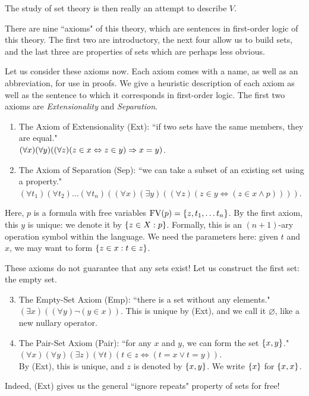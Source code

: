 \documentclass{article}
\begin{document}
The study of set theory is then really an attempt to describe $V$.

There are nine ``axioms" of this theory, which are sentences in first-order logic of this theory. The first two are introductory, the next four allow us to build sets, and the last three are properties of sets which are perhaps less obvious.

Let us consider these axioms now. Each axiom comes with a name, as well as an abbreviation, for use in proofs. We give a heuristic description of each axiom as well as the sentence to which it corresponds in first-order logic. The first two axioms are \textit{Extensionality} and \textit{Separation}.

\begin{enumerate}
    \item The Axiom of Extensionality (Ext): ``if two sets have the same members, they are equal." \\
    $(\forall x)(\forall y)((\forall z)(z \in x \Leftrightarrow z \in y) \Rightarrow x = y)$.
    \item The Axiom of Separation (Sep): ``we can take a subset of an existing set using a property." \\
    $(\forall t_1)(\forall t_2) \dots (\forall t_n)((\forall x)(\exists y)((\forall z)(z \in y \Leftrightarrow (z \in x \land p))))$.
\end{enumerate}

\begin{note}
	Here, $p$ is a formula with free variables $\mathrm{FV}(p) = \left\lbrace z, t_1, \dots t_n \right\rbrace$. By the first axiom, this $y$ is unique: we denote it by $\left\lbrace z \in X : p \right\rbrace$. Formally, this is an $(n+1)$-ary operation symbol within the language. We need the parameters here: given $t$ and $x$, we may want to form $\left\lbrace z \in x: t \in z \right\rbrace$.
\end{note}

These axioms do not guarantee that any sets exist! Let us construct the first set: the empty set.

\begin{enumerate}
	\setcounter{enumi}{2}
    \item The Empty-Set Axiom (Emp): ``there is a set without any elements." \\
    $(\exists x)((\forall y)\lnot(y \in x))$. This is unique by (Ext), and we call it $\varnothing$, like a new nullary operator.
    \item The Pair-Set Axiom (Pair): ``for any $x$ and $y$, we can form the set $\left\lbrace x, y \right\rbrace$." \\
    $(\forall x)(\forall y)(\exists z)(\forall t) (t \in z \Leftrightarrow (t = x \lor t = y))$. \\
    By (Ext), this is unique, and $z$ is denoted by $\left\lbrace x, y \right\rbrace$. We write $\left\lbrace x \right\rbrace$ for $\left\lbrace x, x \right\rbrace$.
\end{enumerate}

\begin{note}
	Indeed, (Ext) gives us the general ``ignore repeats" property of sets for free!
\end{note}
\end{document}
